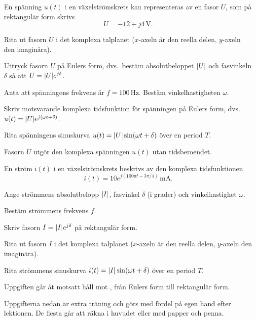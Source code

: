 
En spänning $u(t)$ i en växelströmskrets kan representeras av en fasor $U$, som på rektangulär
form skrivs
\[
  U = -12 + j4\,\text{V}.
\]
\begin{parts}
  \item Rita ut fasorn $U$ i det komplexa talplanet ($x$-axeln är den reella delen, $y$-axeln den
    imaginära).
  \item Uttryck fasorn $U$ på Eulers form, dvs.\ bestäm absolutbeloppet $\lvert U\rvert$ och fasvinkeln
    $\delta$ så att $U = \lvert U\rvert e^{j\delta}$.
  \item Anta att spänningens frekvens är $f = 100\,\text{Hz}$. Bestäm vinkelhastigheten $\omega$.
  \item Skriv motsvarande komplexa tidsfunktion för spänningen på Eulers form, dvs.\
    $u(t) = \lvert U\rvert e^{j(\omega t + \delta)}$.
  \item Rita spänningens sinuskurva $u(t) = \lvert U\rvert\sin(\omega t + \delta)$ över en period $T$.
\end{parts}
\note[Notering] Fasorn $U$ utgör den komplexa spänningen $u(t)$ utan tidsberoendet.

En ström $i(t)$ i en växelströmskrets beskrivs av den komplexa tidsfunktionen
\[
  i(t) = 10e^{j(100\pi t - 3\pi/4)}\,\text{mA}.
\]
\begin{parts}
  \item Ange strömmens absolutbelopp $\lvert I\rvert$, fasvinkel $\delta$ (i grader) och vinkelhastighet
    $\omega$.
  \item Bestäm strömmens frekvens $f$.
  \item Skriv fasorn $I = \lvert I\rvert e^{j\delta}$ på rektangulär form.
  \item Rita ut fasorn $I$ i det komplexa talplanet ($x$-axeln är den reella delen, $y$-axeln den
    imaginära).
  \item Rita strömmens sinuskurva $i(t) = \lvert I\rvert\sin(\omega t + \delta)$ över en period $T$.
\end{parts}
\note[Notering] Uppgiften går åt motsatt håll mot , från Eulers form till rektangulär
form.

\uppgiftsdel{Del 3}{Extrauppgifter}
Uppgifterna nedan är extra träning och görs med fördel på egen hand efter lektionen. De flesta går
att räkna i huvudet eller med papper och penna.

